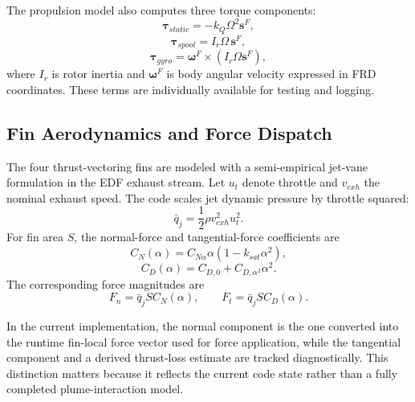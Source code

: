 \documentclass[10pt,twocolumn]{article}
\begin{document}
The propulsion model also computes three torque components:
\begin{equation}
\boldsymbol{\tau}_{static} = -k_Q \Omega^2 \mathbf{s}^{F},
\label{eq:static_torque}
\end{equation}
\begin{equation}
\boldsymbol{\tau}_{spool} = I_r \dot{\Omega}\,\mathbf{s}^{F},
\label{eq:spool_torque}
\end{equation}
\begin{equation}
\boldsymbol{\tau}_{gyro} = \boldsymbol{\omega}^{F}\times\left(I_r \Omega \mathbf{s}^{F}\right),
\label{eq:gyro_torque}
\end{equation}
where $I_r$ is rotor inertia and $\boldsymbol{\omega}^{F}$ is body angular velocity expressed in FRD coordinates. These terms are individually available for testing and logging.

\subsection{Fin Aerodynamics and Force Dispatch}

The four thrust-vectoring fins are modeled with a semi-empirical jet-vane formulation in the EDF exhaust stream. Let $u_t$ denote throttle and $v_{exh}$ the nominal exhaust speed. The code scales jet dynamic pressure by throttle squared:
\begin{equation}
\bar{q}_{j} = \frac{1}{2}\rho v_{exh}^{2} u_t^2.
\label{eq:jet_pressure}
\end{equation}
For fin area $S$, the normal-force and tangential-force coefficients are
\begin{equation}
C_N(\alpha) = C_{N\alpha}\alpha(1-k_{sat}\alpha^2),
\label{eq:cn}
\end{equation}
\begin{equation}
C_D(\alpha) = C_{D,0} + C_{D,\alpha^2}\alpha^2.
\label{eq:cd}
\end{equation}
The corresponding force magnitudes are
\begin{equation}
F_n = \bar{q}_{j} S C_N(\alpha),
\qquad
F_t = \bar{q}_{j} S C_D(\alpha).
\label{eq:fin_forces}
\end{equation}

In the current implementation, the normal component is the one converted into the runtime fin-local force vector used for force application, while the tangential component and a derived thrust-loss estimate are tracked diagnostically. This distinction matters because it reflects the current code state rather than a fully completed plume-interaction model.
\end{document}
